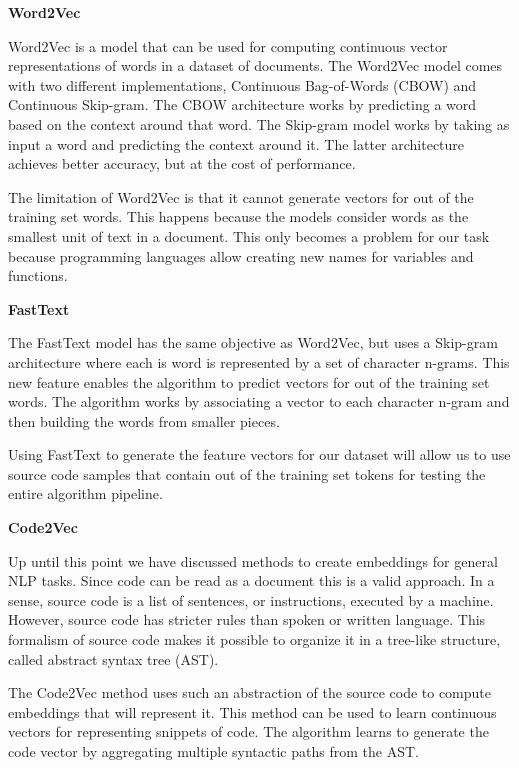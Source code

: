 \documentclass[12pt,a4paper]{report}
\begin{document}
\textbf{Word2Vec}

Word2Vec \cite{mikolov2013efficient} is a model that can be used for computing continuous vector representations of words in a dataset of documents. The Word2Vec model comes with two different implementations, Continuous Bag-of-Words (CBOW) and Continuous Skip-gram. The CBOW architecture works by predicting a word based on the context around that word. The Skip-gram model works by taking as input a word and predicting the context around it. The latter architecture achieves better accuracy, but at the cost of performance.

The limitation of Word2Vec is that it cannot generate vectors for out of the training set words. This happens because the models consider words as the smallest unit of text in a document. This only becomes a problem for our task because programming languages allow creating new names for variables and functions.

\textbf{FastText}

The FastText \cite{bojanowski2017enriching} model has the same objective as Word2Vec, but uses a Skip-gram architecture where each is word is represented by a set of character n-grams. This new feature enables the algorithm to predict vectors for out of the training set words. The algorithm works by associating a vector to each character n-gram and then building the words from smaller pieces.

Using FastText to generate the feature vectors for our dataset will allow us to use source code samples that contain out of the training set tokens for testing the entire algorithm pipeline.

\textbf{Code2Vec}

Up until this point we have discussed methods to create embeddings for general NLP tasks. Since code can be read as a document this is a valid approach. In a sense, source code is a list of sentences, or instructions, executed by a machine. However, source code has stricter rules than spoken or written language. This formalism of source code makes it possible to organize it in a tree-like structure, called abstract syntax tree (AST). 

The Code2Vec \cite{10.1145/3290353} method uses such an abstraction of the source code to compute embeddings that will represent it. This method can be used to learn continuous vectors for representing snippets of code. The algorithm learns to generate the code vector by aggregating multiple syntactic paths from the AST. 
\end{document}
